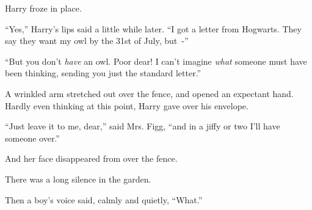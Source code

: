 Harry froze in place\emph{.}

``Yes,'' Harry's lips said a little while later. ``I got a letter from Hogwarts. They say they want my owl by the 31st of July, but~-''

``But you don't \emph{have} an owl. Poor dear! I can't imagine \emph{what} someone must have been thinking, sending you just the standard letter.''

A wrinkled arm stretched out over the fence, and opened an expectant hand. Hardly even thinking at this point, Harry gave over his envelope.

``Just leave it to me, dear,'' said Mrs. Figg, ``and in a jiffy or two I'll have someone over.''

And her face disappeared from over the fence.

There was a long silence in the garden.

Then a boy's voice said, calmly and quietly, ``What.''
